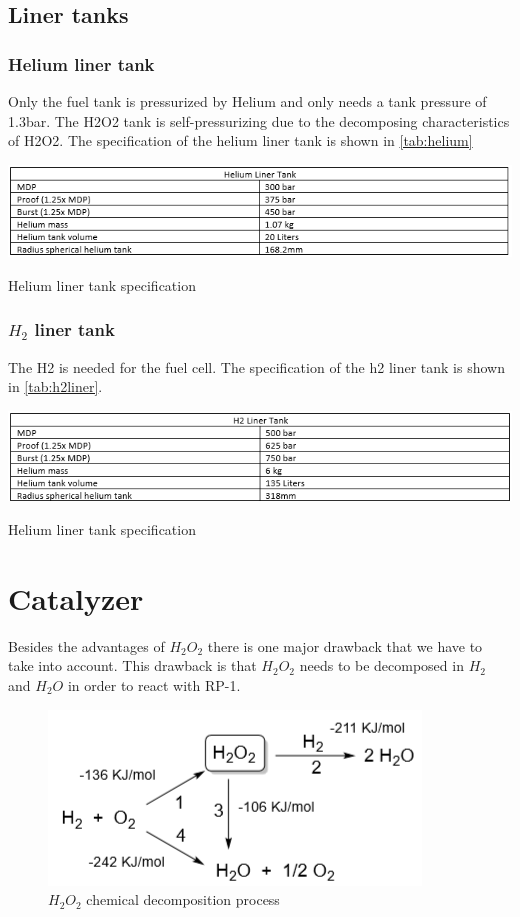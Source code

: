 \subsection{Liner tanks}
\subsubsection{Helium liner tank}

Only the fuel tank is pressurized by Helium and only needs a tank pressure of 1.3bar. The H2O2 tank is self-pressurizing due to the decomposing characteristics of H2O2. The specification of the helium liner tank is shown in \autoref{tab:helium}
\begin{table}[H]
    \centering
    \includegraphics[width = \linewidth]{heliumliner}
    \caption{Helium liner tank specification}\label{tab:helium}
\end{table}{}
\subsubsection{$H_2$ liner tank}
The H2 is needed for the fuel cell. The specification of the h2 liner tank is shown in \autoref{tab:h2liner}.
\begin{table}[H]
    \centering
    \includegraphics[width = \linewidth]{h2liner}
    \caption{Helium liner tank specification}\label{tab:h2liner}
\end{table}{}

\section{Catalyzer}
Besides the advantages of $H_2O_2$ there is one major drawback that we have to take into account. This drawback is that $H_2O_2$ needs to be decomposed in $H_2$ and $H_2O$ in order to react with RP-1. 

\begin{figure}[H]
	\centering
	\includegraphics{H2O2}
	\caption{$H_2O_2$ chemical decomposition process}
\end{figure}

